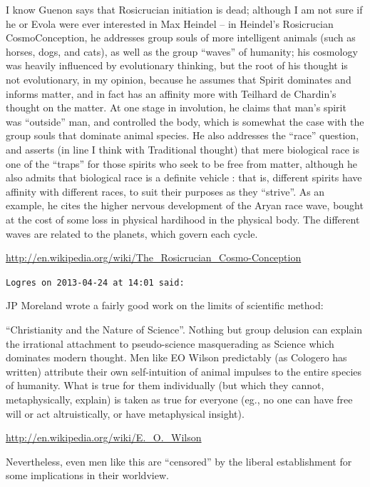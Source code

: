 \begin{footnotesize}
\begin{sffamily}
I know Guenon says that Rosicrucian initiation is dead; although I am not sure if he or Evola were ever interested in Max Heindel -- in Heindel's Rosicrucian CosmoConception, he addresses group souls of more intelligent animals (such as horses, dogs, and cats), as well as the group ``waves'' of humanity; his cosmology was heavily influenced by evolutionary thinking, but the root of his thought is not evolutionary, in my opinion, because he assumes that Spirit dominates and informs matter, and in fact has an affinity more with Teilhard de Chardin's thought on the matter. At one stage in involution, he claims that man's spirit was ``outside'' man, and controlled the body, which is somewhat the case with the group souls that dominate animal species. He also addresses the ``race'' question, and asserts (in line I think with Traditional thought) that mere biological race is one of the ``traps'' for those spirits who seek to be free from matter, although he also admits that biological race is a definite vehicle : that is, different spirits have affinity with different races, to suit their purposes as they ``strive''. As an example, he cites the higher nervous development of the Aryan race wave, bought at the cost of some loss in physical hardihood in the physical body. The different waves are related to the planets, which govern each cycle.

\url{http://en.wikipedia.org/wiki/The_Rosicrucian_Cosmo-Conception}


\hfill

\texttt{Logres on 2013-04-24 at 14:01 said:}

JP Moreland wrote a fairly good work on the limits of scientific method:

``Christianity and the Nature of Science''. Nothing but group delusion can explain the irrational attachment to pseudo-science masquerading as Science which dominates modern thought. Men like EO Wilson predictably (as Cologero has written) attribute their own self-intuition of animal impulses to the entire species of humanity. What is true for them individually (but which they cannot, metaphysically, explain) is taken as true for everyone (eg., no one can have free will or act altruistically, or have metaphysical insight).

\url{http://en.wikipedia.org/wiki/E._O._Wilson}

Nevertheless, even men like this are ``censored'' by the liberal establishment for some implications in their worldview.

\end{sffamily}
\end{footnotesize}

